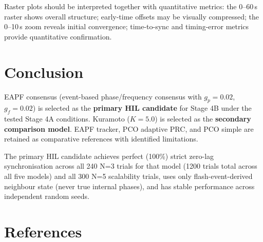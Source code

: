 \documentclass[11pt,a4paper]{article}
\begin{document}
Raster plots should be interpreted together with quantitative metrics:
the 0--60\,s raster shows overall structure; early-time offsets may be
visually compressed; the 0--10\,s zoom reveals initial convergence;
time-to-sync and timing-error metrics provide quantitative confirmation.



\FloatBarrier

\section{Conclusion}

EAPF consensus (event-based phase/frequency consensus with $g_p = 0.02$,
$g_f = 0.02$) is selected as the \textbf{primary HIL candidate} for
Stage 4B under the tested Stage 4A conditions.  Kuramoto ($K = 5.0$) is
selected as the \textbf{secondary comparison model}.  EAPF tracker, PCO
adaptive PRC, and PCO simple are retained as comparative references with
identified limitations.

The primary HIL candidate achieves perfect (100\%) strict zero-lag
synchronisation across all 240 N=3 trials for that model (1200 trials total
across all five models) and all 300 N=5 scalability trials, uses only
flash-event-derived neighbour state (never true internal phases), and has
stable performance across independent random seeds.

\section*{References}



\end{document}
